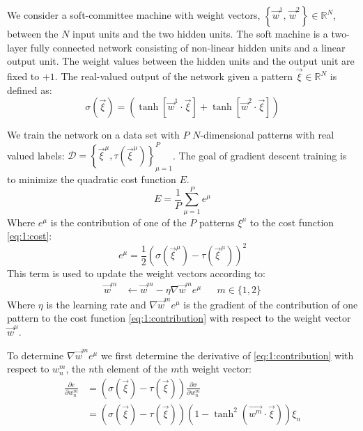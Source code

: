 We consider a soft-committee machine with weight vectors, $\left\{\vec{w}^1, \, \vec{w}^2 \right\} \in \mathbb{R}^N$, between the $N$ input units and the two hidden units. The soft machine  is a two-layer fully connected network consisting of non-linear hidden units and a linear output unit. The weight values between the hidden units and the output unit are fixed to $+1$. The real-valued output of the network given a pattern $\vec{\xi} \in \mathbb{R}^N$ is defined as:
\begin{equation}\label{eq:1:sigma}
	\sigma(\vec{\xi}) = \left(\tanh\left[\vec{w}^1 \cdot \vec{\xi}\right] + \tanh\left[\vec{w}^2 \cdot \vec{\xi}\right]\right)
\end{equation}

We train the network on a data set with $P$ $N$-dimensional patterns with real valued labels: ${\mathcal{D} = \left\{ \vec{\xi}^\mu, \tau\left(\vec{\xi}^\mu\right) \right\}_{\mu = 1}^{P}}$. The goal of gradient descent training is to minimize the quadratic cost function $E$. 
\begin{equation}\label{eq:1:cost}
	E = \frac{1}{P} \sum_{\mu = 1}^{P} e^\mu
\end{equation}
Where $e^\mu$ is the contribution of one of the $P$ patterns $\xi^\mu$ to the cost function \eqref{eq:1:cost}:
\begin{equation}\label{eq:1:contribution}
	e^\mu = \frac{1}{2}\left(\sigma\left(\vec{\xi}^\mu\right) - \tau\left(\vec{\xi}^\mu\right)\right)^2
\end{equation}
This term is used to update the weight vectors according to:
\begin{align}\label{eq:1:update}
	\vec{w}^m & \leftarrow \vec{w}^m - \eta \nabla \vec{w}^m e^\mu && m \in \{1, 2\}
\end{align}
Where $\eta$ is the learning rate and $\nabla \vec{w}^m e^\mu$ is the gradient of the contribution of one pattern to the cost function \eqref{eq:1:contribution} with respect to the weight vector $\vec{w}^\mu$. 

To determine $\nabla \vec{w}^m e^\mu$ we first determine the derivative of \eqref{eq:1:contribution} with respect to $w_n^m$, the $n$th element of the $m$th weight vector:
\begin{align}\label{eq:1:gradient}
	\frac{\partial e}{\partial w_n^m} & = (\sigma(\vec{\xi}) - \tau(\vec{\xi})) \frac{\partial \sigma}{\partial w_n^m} \nonumber \\
	~& = (\sigma(\vec{\xi}) - \tau(\vec{\xi})) (1 - \tanh^2(\vec{w^m} \cdot \vec{\xi})) \xi_n 
\end{align}

